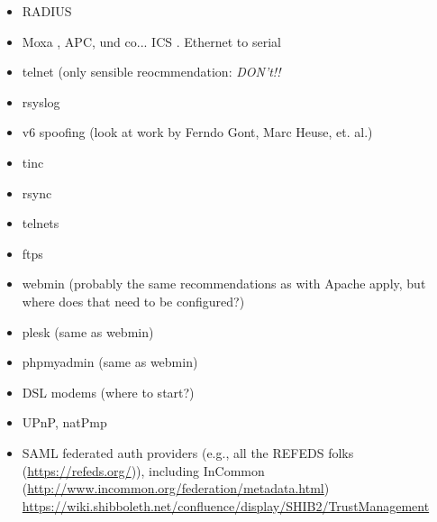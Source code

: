 \begin{minipage}[b]{0.5\linewidth}
\begin{itemize}
\item RADIUS 
\item Moxa , APC, und co... ICS . Ethernet to serial 
\item telnet (only sensible reocmmendation: \emph{DON't!!}
\item rsyslog 
\item v6 spoofing (look at work by Ferndo Gont, Marc Heuse, et. al.)
\item tinc
\item rsync 
\item telnets 
\item ftps 
\item webmin (probably the same recommendations as with Apache apply, but where does that need to be configured?)
\item plesk (same as webmin)
\item phpmyadmin (same as webmin)
\item DSL modems (where to start?)
\item UPnP, natPmp 
\item SAML federated auth providers (e.g., all the REFEDS folks (\url{https://refeds.org/})), including InCommon (\url{http://www.incommon.org/federation/metadata.html})
  \url{https://wiki.shibboleth.net/confluence/display/SHIB2/TrustManagement} 
\end{itemize}
\end{minipage}





